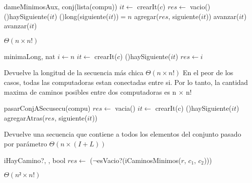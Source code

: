 \begin{Algoritmos}
  \begin{algoritmo}{dameMinimosAux}{, }{conj(lista(compu))}
     $it \gets$ crearIt($c$)
    $res \gets$ vacio() 
    \While(){haySiguiente($it$)}{
      \eIf(){long(siguiente($it$))$=n$}{
        agregar($res$, siguiente($it$))
        avanzar($it$) 
      }{
        avanzar($it$) 
      }
    }
  \end{algoritmo}
  \datosAlgoritmo{} %
  {} %
  {} %
  {$\Theta(n \times n!)$} %
  {} %

  \begin{algoritmo}{minimaLong}{, }{nat}
     $i \gets n$
     $it \gets$ crearIt($c$)
    \While(){haySiguiente($it$)}{
    }
    $res \gets i$
  \end{algoritmo}
  \datosAlgoritmo
  {Devuelve la longitud de la secuencia m\'{a}s chica} %
  {} %
  {} %
  {$\Theta(n \times n!)$} %
  {En el peor de los casos, todas las computadoras estan conectadas entre si. Por lo tanto, la cantidad maxima de caminos posibles entre dos computadoras es n $\times$ n!} %
    
	\begin{algoritmo}{pasarConjASecu}{}{secu(compu)}{}
		$res \gets$ vacia()
		 $it \gets$ crearIt(c)
		\While(){haySiguiente($it$)}{
			agregarAtras($res$, siguiente($it$)) 		
		}
	\end{algoritmo}    
  \datosAlgoritmo
  {Devuelve una secuencia que contiene a todos los elementos del conjunto pasado por par\'{a}metro} %
  {} %
  {} %
  {$\Theta(n \times (I + L))$} %
  {} %
     
  \begin{algoritmo}{iHayCamino?}{, , }{bool}{}
    $res \gets$ ($\neg$esVacio?(iCaminosMinimos($r$, $c_{1}$, $c_{2}$))) 
  \end{algoritmo}
  \datosAlgoritmo{} %
  {} %
  {} %
  {$\Theta(n² \times n!)$} %
  {} %


\end{Algoritmos}
